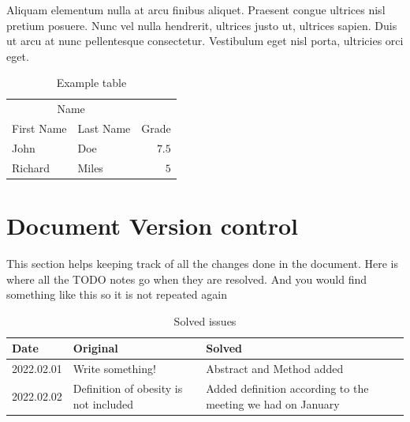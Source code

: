 \documentclass[10pt, a4paper, twocolumn]{article} %
\begin{document}
Aliquam elementum nulla at arcu finibus aliquet. Praesent congue ultrices nisl pretium posuere. Nunc vel nulla hendrerit, ultrices justo ut, ultrices sapien.   Duis ut arcu at nunc pellentesque consectetur. Vestibulum eget nisl porta, ultricies orci eget.

\begin{table}
	\caption{Example table}
	\centering
	\begin{tabular}{llr}
		\toprule
		\multicolumn{2}{c}{Name} \\
		\cmidrule(r){1-2}
		First Name & Last Name & Grade \\
		\midrule
		John & Doe & $7.5$ \\
		Richard & Miles & $5$ \\
		\bottomrule
	\end{tabular}
\end{table}

\section{Document Version control}

This section helps keeping track of all the changes done in the document. Here is where all the TODO notes go when they are resolved. And you would find something like this so it is not repeated again\\

\begin{table}
	\caption{Solved issues}
	\centering
	\begin{tabular}{lll}
		\toprule
		Date & Original & Solved \\
		\midrule
		2022.02.01 & Write something! & Abstract and Method added \\
		2022.02.02 & Definition of obesity is not included & Added definition according to the meeting we had on January \\
		\bottomrule
	\end{tabular}
\end{table}






 

\end{document}
